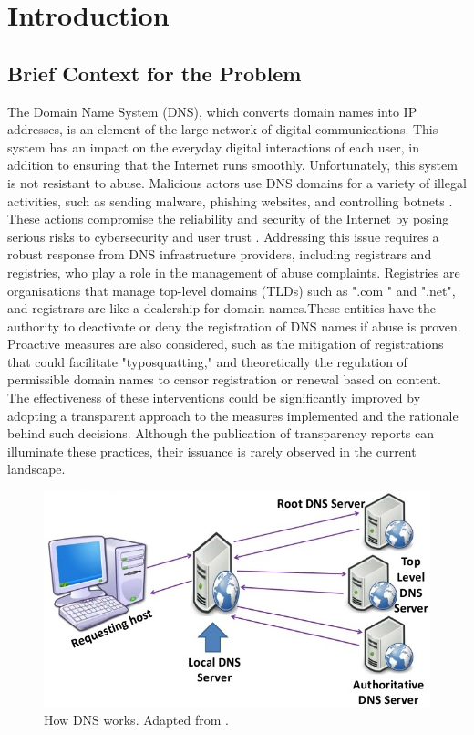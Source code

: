 \chapter{Introduction}


\section{Brief Context for the Problem}

The Domain Name System (DNS), which converts domain names into IP addresses, is an element of the large network of digital communications. This system has an impact on the everyday digital interactions of each user, in addition to ensuring that the Internet runs smoothly. Unfortunately, this system is not resistant to abuse. Malicious actors use DNS domains for a variety of illegal activities, such as sending malware, phishing websites, and controlling botnets \cite{so2022}. These actions compromise the reliability and security of the Internet by posing serious risks to cybersecurity and user trust \cite{bayer2022}. Addressing this issue requires a robust response from DNS infrastructure providers, including registrars and registries, who play a role in the management of abuse complaints. Registries are organisations that manage top-level domains (TLDs) such as ".com " and ".net", and registrars are like a dealership for domain names.These entities have the authority to deactivate or deny the registration of DNS names if abuse is proven. Proactive measures are also considered, such as the mitigation of registrations that could facilitate "typosquatting," and theoretically the regulation of permissible domain names to censor registration or renewal based on content. The effectiveness of these interventions could be significantly improved by adopting a transparent approach to the measures implemented and the rationale behind such decisions. Although the publication of transparency reports can illuminate these practices, their issuance is rarely observed in the current landscape.

\begin{figure}[H]
    \centering
    \includegraphics[width=0.5\linewidth]{introduction/dnsWork.jpg}
    \caption{How DNS works. Adapted from \cite{blanche2018understandingDNS}. }
    \label{fig:dnsIntro}
\end{figure}

